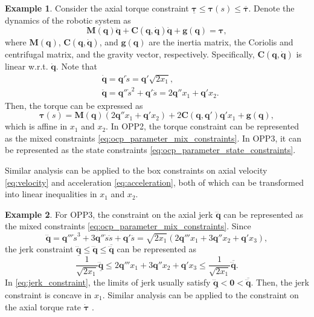 \documentclass[journal]{IEEEtran}
\theoremstyle{definition}
\theoremstyle{definition}
\newtheorem{example}{Example}
\renewcommand\vector[1]{\boldsymbol{#1}}
\newcommand\vg{{\vector{g}}}
\newcommand\vq{{\vector{q}}}
\newcommand\vtau{{\vector{\tau}}}
\newcommand\vzero{{\vector{0}}}
\newcommand\mC{{\mathbf{C}}}
\newcommand\mM{{\mathbf{M}}}
\begin{document}
\begin{example}
    Consider the axial torque constraint $\underline{\vtau}\leq\vtau(s)\leq \overline\vtau$. Denote the dynamics of the robotic system as
    \begin{equation}
        \mM(\vq)\ddot{\vq} + \mC(\vq, \dot{\vq})\dot{\vq} + \vg(\vq) = \vtau,
    \end{equation}
    where $\mM(\vq)$, $\mC(\vq, \dot{\vq})$, and $\vg(\vq)$ are the inertia matrix, the Coriolis and centrifugal matrix, and the gravity vector, respectively. Specifically, $\mC(\vq, \dot{\vq})$ is linear w.r.t. $\dot{\vq}$. Note that
    \begin{subequations}
        \begin{align}
            &\dot{\vq}=\vq'\dot{s}=\vq'\sqrt{2x_1},\label{eq:velocity}\\
            &\ddot{\vq}=\vq''\dot{s}^2+\vq'\ddot{s}=2\vq''x_1+\vq'x_2.\label{eq:acceleration}
        \end{align}
    \end{subequations}
    Then, the torque can be expressed as
    \begin{equation}\label{eq:torque}
        \vtau(s) = \mM(\vq)(2\vq''x_1+\vq'x_2) + 2\mC(\vq, \vq')\vq'x_1 + \vg(\vq),
    \end{equation}
    which is affine in $x_1$ and $x_2$. In OPP2, the torque constraint can be represented as the mixed constraints \eqref{eq:ocp_parameter_mix_constraints}. In OPP3, it can be represented as the state constraints \eqref{eq:ocp_parameter_state_constraints}.

    Similar analysis can be applied to the box constraints on axial velocity \eqref{eq:velocity} and acceleration \eqref{eq:acceleration}, both of which can be transformed into linear inequalities in $x_1$ and $x_2$.
\end{example}

\begin{example}
    For OPP3, the constraint on the axial jerk $\dddot{\vq}$ can be represented as the mixed constraints \eqref{eq:ocp_parameter_mix_constraints}. Since
    \begin{equation}
        \dddot{\vq}=\vq'''\dot{s}^3 + 3\vq''\dot{s}\ddot{s} + \vq'\dddot{s} = \sqrt{2x_1}(2\vq'''x_1 + 3\vq''x_2 + \vq'x_3),
    \end{equation}
    the jerk constraint $\underline{\dddot{\vq}}\leq \dddot{\vq}\leq \overline{\dddot{\vq}}$ can be represented as
    \begin{equation}\label{eq:jerk_constraint}
        \frac{1}{\sqrt{2x_1}}\underline{\dddot{\vq}} \leq 2\vq'''x_1 + 3\vq''x_2 + \vq'x_3 \leq \frac{1}{\sqrt{2x_1}}\overline{\dddot{\vq}}.
    \end{equation}
    In \eqref{eq:jerk_constraint}, the limits of jerk usually satisfy $\underline{\dddot{\vq}}<\vzero<\overline{\dddot{\vq}}$. Then, the jerk constraint is concave in $x_1$. Similar analysis can be applied to the constraint on the axial torque rate $\dot{\vtau}$ \cite{debrouwere2013time,wang2026online}.
\end{example}
\end{document}
